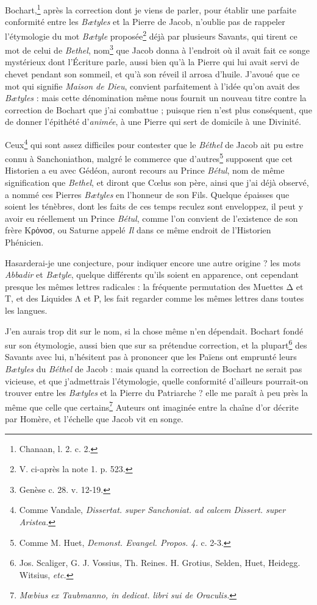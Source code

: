 \documentclass[a4paper, 11pt, oneside, polutonikogreek, french]{article}
\begin{document}
Bochart,\footnote{Chanaan, l. 2. c. 2.} après la correction dont je viens de parler, pour établir une parfaite conformité entre les \emph{Bætyles} et la Pierre de Jacob, n'oublie pas de rappeler l'étymologie du mot \emph{Bætyle} proposée\footnote{V. ci-après la note 1. p. 523.} déjà par plusieurs Savants, qui tirent ce mot de celui de \emph{Bethel}, nom\footnote{Genèse c. 28. v. 12-19.} que Jacob donna à l'endroit où il avait fait ce songe mystérieux dont l'Écriture parle, aussi bien qu'à la Pierre qui lui avait servi de chevet pendant son sommeil, et qu'à son réveil il arrosa d'huile. J'avoué que ce mot qui signifie \emph{Maison de Dieu}, convient parfaitement à l'idée qu'on avait des \emph{Bætyles} : mais cette dénomination même nous fournit un nouveau titre contre la correction de Bochart que j'ai combattue ; puisque rien n'est plus conséquent, que de donner l'épithété d'\emph{animée}, à une Pierre qui sert de domicile à une Divinité.

Ceux\footnote{Comme Vandale, \emph{Dissertat. super Sanchoniat. ad calcem Dissert. super Aristea.}} qui sont assez difficiles pour contester que le \emph{Béthel} de Jacob ait pu estre connu à Sanchoniathon, malgré le commerce que d'autres\footnote{Comme M. Huet, \emph{Demonst. Evangel. Propos. 4.} c. 2-3.} supposent que cet Historien a eu avec Gédéon, auront recours au Prince \emph{Bétul}, nom de même signification que \emph{Bethel}, et diront que Cœlus son père, ainsi que j'ai déjà observé, a nommé ces Pierres \emph{Bætyles} en l'honneur de son Fils. Quelque épaisses que soient les ténèbres, dont les faits de ces temps reculez sont enveloppez, il peut y avoir eu réellement un Prince \emph{Bétul}, comme l'on convient de l'existence de son frère Κρὁνοσ, ou Saturne appelé \emph{Il} dans ce même endroit de l'Historien Phénicien.

Hasarderai-je une conjecture, pour indiquer encore une autre origine ? les mots \emph{Abbadir} et \emph{Bætyle}, quelque différents qu'ils soient en apparence, ont cependant presque les mêmes lettres radicales : la fréquente permutation des Muettes Δ et T, et des Liquides Λ et P, les fait regarder comme les mêmes lettres dans toutes les langues.

J'en aurais trop dit sur le nom, si la chose même n'en dépendait. Bochart fondé sur son étymologie, aussi bien que sur sa prétendue correction, et la plupart\footnote{Jos. Scaliger, G. J. Vossius, Th. Reines. H. Grotius, Selden, Huet, Heidegg. Witsius, \emph{etc.}} des Savants avec lui, n'hésitent pas à prononcer que les Païens ont emprunté leurs \emph{Bætyles} du \emph{Béthel} de Jacob : mais quand la correction de Bochart ne serait pas vicieuse, et que j'admettrais l'étymologie, quelle conformité d'ailleurs pourrait-on trouver entre les \emph{Bætyles} et la Pierre du Patriarche ? elle me paraît à peu près la même que celle que certains\footnote{\emph{Mœbius ex Taubmanno, in dedicat. libri sui de Oraculis.}} Auteurs ont imaginée entre la chaîne d'or décrite par Homère, et l'échelle que Jacob vit en songe. 
\end{document}
